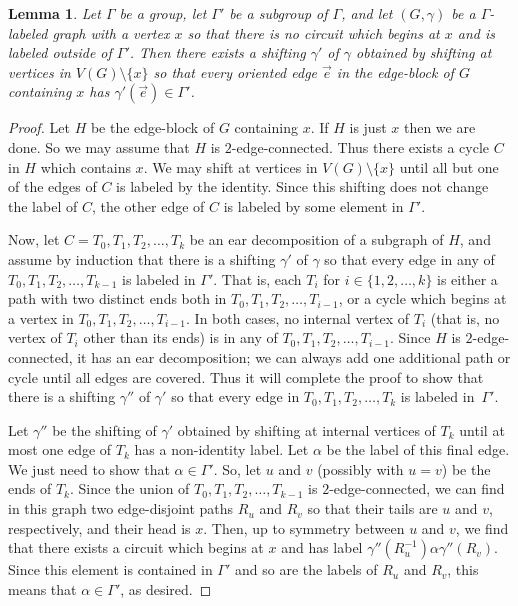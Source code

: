 \documentclass[11pt]{article}
\newtheorem{lemma}[thm]{Lemma}
\theoremstyle{definition}
\begin{document}
\begin{lemma}
\label{lem:edgeBlock}
    Let $\Gamma$ be a group, let $\Gamma'$ be a subgroup of $\Gamma$, and let $(G, \gamma)$ be a $\Gamma$-labeled graph with a vertex $x$ so that there is no circuit which begins at $x$ and is labeled outside of $\Gamma'$. Then there exists a shifting $\gamma'$ of $\gamma$ obtained by shifting at vertices in $V(G)\setminus \{x\}$ so that every oriented edge $\vec{e}$ in the edge-block of $G$ containing $x$ has $\gamma'(\vec{e})\in \Gamma'$.
\end{lemma}
\begin{proof}
    Let $H$ be the edge-block of $G$ containing $x$. If $H$ is just $x$ then we are done. So we may assume that $H$ is $2$-edge-connected. Thus there exists a cycle $C$ in $H$ which contains $x$. We may shift at vertices in $V(G)\setminus \{x\}$ until all but one of the edges of $C$ is labeled by the identity. Since this shifting does not change the label of $C$, the other edge of $C$ is labeled by some element in $\Gamma'$. 
    
    Now, let $C=T_0, T_1, T_2, \ldots, T_k$ be an ear decomposition of a subgraph of $H$, and assume by induction that there is a shifting $\gamma'$ of $\gamma$ so that every edge in any of $T_0, T_1, T_2, \ldots, T_{k-1}$ is labeled in $\Gamma'$. That is, each $T_i$ for $i\in \{1,2,\ldots, k\}$ is either a path with two distinct ends both in $T_0, T_1, T_2, \ldots, T_{i-1}$, or a cycle which begins at a vertex in $T_0, T_1, T_2, \ldots, T_{i-1}$. In both cases, no internal vertex of $T_i$ (that is, no vertex of $T_i$ other than its ends) is in any of $T_0, T_1, T_2, \ldots, T_{i-1}$. Since $H$ is $2$-edge-connected, it has an ear decomposition; we can always add one additional path or cycle until all edges are covered. Thus it will complete the proof to show that there is a shifting $\gamma''$ of $\gamma'$ so that every edge in $T_0, T_1, T_2, \ldots, T_{k}$ is labeled in~$\Gamma'$.

    Let $\gamma''$ be the shifting of $\gamma'$ obtained by shifting at internal vertices of $T_k$ until at most one edge of $T_k$ has a non-identity label. Let $\alpha$ be the label of this final edge. We just need to show that $\alpha \in \Gamma'$. So, let $u$ and $v$ (possibly with $u=v$) be the ends of $T_k$. Since the union of $T_0, T_1, T_2, \ldots, T_{k-1}$ is $2$-edge-connected, we can find in this graph two edge-disjoint paths $R_u$ and $R_v$ so that their tails are $u$ and $v$, respectively, and their head is $x$. Then, up to symmetry between $u$ and $v$, we find that there exists a circuit which begins at $x$ and has label $\gamma''(R_u^{-1})\alpha \gamma''(R_v)$. Since this element is contained in $\Gamma'$ and so are the labels of $R_u$ and $R_v$, this means that $\alpha \in \Gamma'$, as desired.
\end{proof}
\end{document}
